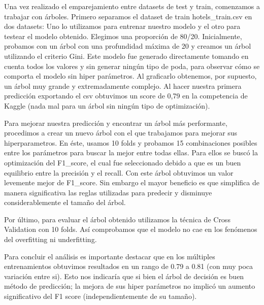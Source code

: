 \documentclass{article}
\begin{document}
Una vez realizado el emparejamiento entre datasets de test y train, comenzamos a trabajar con árboles. Primero separamos el dataset de train hotels\_train.csv en dos datasets: Uno lo utilizamos para entrenar nuestro modelo y el otro para testear el modelo obtenido. Elegimos una proporción de 80/20. Inicialmente, probamos con un árbol con una profundidad máxima de 20 y creamos un árbol utilizando el criterio Gini. Este modelo fue generado directamente tomando en cuenta todos los valores y sin generar ningún tipo de poda, para observar cómo se comporta el modelo sin hiper parámetros. Al graficarlo obtenemos, por supuesto, un árbol muy grande y extremadamente complejo. Al hacer nuestra primera predicción exportando el csv obtuvimos un score de 0,79 en la competencia de Kaggle (nada mal para un árbol sin ningún tipo de optimización).

Para mejorar nuestra predicción y encontrar un árbol más performante, procedimos a crear un nuevo árbol con el que trabajamos para mejorar sus hiperparametros. En éste, usamos 10 folds y probamos 15 combinaciones posibles entre los parámetros para buscar la mejor entre todas ellas. Para ellos se buscó la optimización del F1\_score, el cual fue seleccionado debido a que es un buen equilibrio entre la precisión y el recall. Con este árbol obtuvimos un valor levemente mejor de F1\_score. Sin embargo el mayor beneficio es que simplifica de manera significativa las reglas utilizadas para predecir y disminuye considerablemente el tamaño del árbol.

Por último, para evaluar el árbol obtenido utilizamos la técnica de Cross Validation con 10 folds. Así comprobamos que el modelo no cae en los fenómenos del overfitting ni underfitting.

Para concluir el análisis es importante destacar que en los múltiples entrenamientos obtuvimos resultados en un rango de 0.79 a 0.81 (con muy poca variación entre si). Esto nos indicaría que si bien el árbol de decisión es buen método de predicción; la mejora de sus hiper parámetros no implicó un aumento significativo del F1 score (independientemente de su tamaño). 
\end{document}
